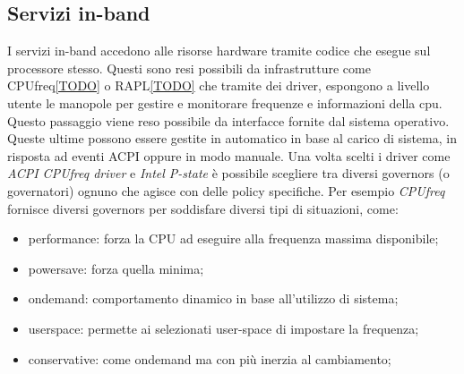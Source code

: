 
\subsection{Servizi in-band} %

I servizi in-band accedono alle risorse hardware tramite codice che esegue sul processore stesso. Questi sono resi possibili da infrastrutture come CPUfreq\ref{TODO} o RAPL\ref{TODO} che tramite dei driver, espongono a livello utente le manopole per gestire e monitorare frequenze e informazioni della cpu. Questo passaggio viene reso possibile da interfacce fornite dal sistema operativo. Queste ultime possono essere gestite in automatico in base al carico di sistema, in risposta ad eventi ACPI oppure in modo manuale. Una volta scelti i driver come \emph{ACPI CPUfreq driver} e \emph{Intel P-state} è possibile scegliere tra diversi governors (o governatori) ognuno che agisce con delle policy specifiche.
Per esempio \emph{CPUfreq} fornisce diversi governors per soddisfare diversi tipi di situazioni, come:
\begin{itemize}
    \item performance: forza la CPU ad eseguire alla frequenza massima disponibile;
    \item powersave: forza quella minima;
    \item ondemand: comportamento dinamico in base all'utilizzo di sistema;
    \item userspace: permette ai selezionati user-space di impostare la frequenza; 
    \item conservative: come ondemand ma con più inerzia al cambiamento;
\end{itemize}

